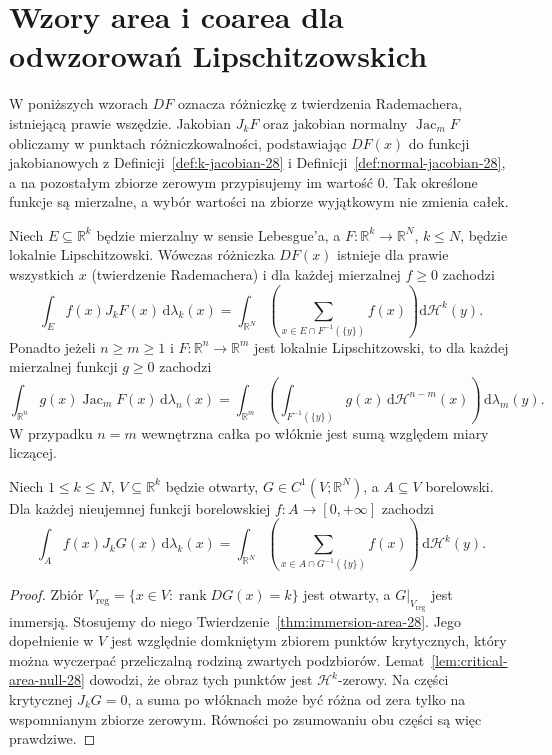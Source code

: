 \section{Wzory area i coarea dla odwzorowań Lipschitzowskich}
W poniższych wzorach $DF$ oznacza różniczkę z twierdzenia
Rademachera, istniejącą prawie wszędzie. Jakobian $J_kF$
oraz jakobian normalny $\operatorname{Jac}_mF$ obliczamy
w punktach różniczkowalności, podstawiając $DF(x)$
do funkcji jakobianowych z
Definicji~\ref{def:k-jacobian-28} i
Definicji~\ref{def:normal-jacobian-28},
a na pozostałym zbiorze zerowym przypisujemy im wartość $0$.
Tak określone funkcje są mierzalne, a wybór wartości
na zbiorze wyjątkowym nie zmienia całek.
\begin{twierdzenie}
\label{thm:lipschitz-area-coarea-28}
Niech $E\subseteq\mathbb R^k$ będzie mierzalny
w sensie Lebesgue'a, a $F:\mathbb R^k\to\mathbb R^N$,
$k\le N$, będzie lokalnie Lipschitzowski.
Wówczas różniczka $DF(x)$ istnieje dla prawie
wszystkich $x$ (twierdzenie Rademachera)
i dla każdej mierzalnej $f\ge0$ zachodzi
\[
 \int_E f(x)J_kF(x)\,\mathrm d\lambda_k(x)
 =\int_{\mathbb R^N}\left(\sum_{x\in E\cap F^{-1}(\{y\})}
 f(x)\right)\mathrm d\mathcal H^k(y).
\]
Ponadto jeżeli $n\ge m\ge1$ i
$F:\mathbb R^n\to\mathbb R^m$ jest lokalnie
Lipschitzowski, to dla każdej mierzalnej
funkcji $g\ge0$ zachodzi
\[
 \int_{\mathbb R^n}g(x)\operatorname{Jac}_mF(x)
 \,\mathrm d\lambda_n(x)
 =\int_{\mathbb R^m}\left(
 \int_{F^{-1}(\{y\})}g(x)
 \,\mathrm d\mathcal H^{n-m}(x)\right)
 \,\mathrm d\lambda_m(y).
\]
W przypadku $n=m$ wewnętrzna całka po włóknie
jest sumą względem miary liczącej.
\end{twierdzenie}

\begin{lemat}
\label{lem:c1-general-area-28}
Niech $1\le k\le N$, $V\subseteq\mathbb R^k$ będzie
otwarty, $G\in C^1(V;\mathbb R^N)$, a $A\subseteq V$
borelowski. Dla każdej nieujemnej funkcji borelowskiej
$f:A\to[0,+\infty]$ zachodzi
\[
 \int_Af(x)J_kG(x)\,\mathrm d\lambda_k(x)
 =\int_{\mathbb R^N}\left(
 \sum_{x\in A\cap G^{-1}(\{y\})}f(x)\right)
 \,\mathrm d\mathcal H^k(y).
\]
\end{lemat}
\begin{proof}
Zbiór $V_{\mathrm{reg}}=\{x\in V:\operatorname{rank}DG(x)=k\}$
jest otwarty, a $G|_{V_{\mathrm{reg}}}$ jest immersją.
Stosujemy do niego
Twierdzenie~\ref{thm:immersion-area-28}.
Jego dopełnienie w $V$ jest względnie domkniętym
zbiorem punktów krytycznych, który można wyczerpać
przeliczalną rodziną zwartych podzbiorów.
Lemat~\ref{lem:critical-area-null-28} dowodzi, że obraz
tych punktów jest $\mathcal H^k$-zerowy.
Na części krytycznej $J_kG=0$, a suma po włóknach
może być różna od zera tylko na wspomnianym
zbiorze zerowym. Równości po zsumowaniu obu
części są więc prawdziwe.
\end{proof}

